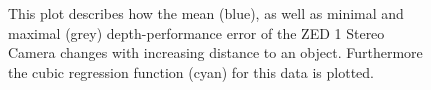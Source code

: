 \begin{figure}[h]
\begin{center}
		\caption{This plot describes how the mean (blue), as well as minimal and maximal (grey) depth-performance error of the ZED 1 Stereo Camera changes with increasing distance to an object. Furthermore the cubic regression function (cyan) for this data is plotted. 
		 }
	 	\label{plot:zed1Benchmark}
	\end{center}
\end{figure}
